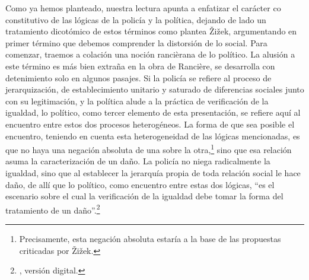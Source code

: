 Como ya hemos planteado, nuestra lectura apunta a enfatizar el carácter co constitutivo de las lógicas de la policía y la política, dejando de lado un tratamiento dicotómico de estos términos como plantea Žižek, argumentando en primer término que debemos comprender la distorsión de lo social. Para comenzar, traemos a colación una noción rancièrana de lo político. La alusión a este término es más bien extraña en la obra de Rancière, se desarrolla con detenimiento solo en algunos pasajes. Si la policía se refiere al proceso de jerarquización, de establecimiento unitario y saturado de diferencias sociales junto con su legitimación, y la política alude a la práctica de verificación de la igualdad, lo político, como tercer elemento de esta presentación, se refiere aquí al encuentro entre estos dos procesos heterogéneos. La forma de que sea posible el encuentro, teniendo en cuenta esta heterogeneidad de las lógicas mencionadas, es que no haya una negación absoluta de una sobre la otra,\footnote{Precisamente, esta negación absoluta estaría a la base de las propuestas criticadas por Žižek.} sino que esa relación asuma la caracterización de un daño. La policía no niega radicalmente la igualdad, sino que al establecer la jerarquía propia de toda relación social le hace daño, de allí que lo político, como encuentro entre estas dos lógicas, \enquote{es el escenario sobre el cual la verificación de la igualdad debe tomar la forma del tratamiento de un daño}.\footnote{\cite[][1]{@7082-RANCIERE2004}, versión digital.}

